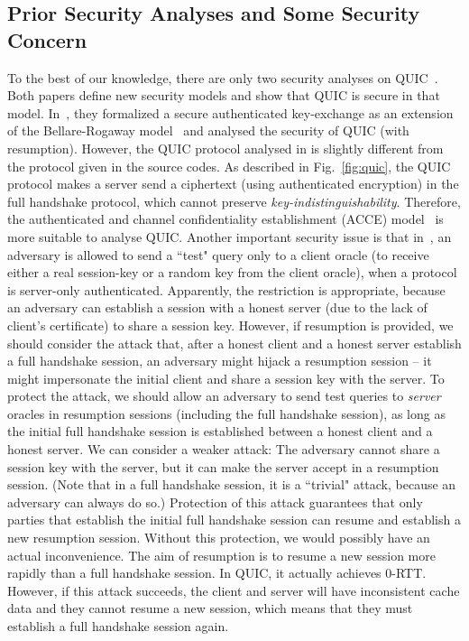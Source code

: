 \subsection{Prior Security Analyses and Some Security Concern} \label{sec:concern}
To the best of our knowledge, there are only two security analyses on QUIC~\cite{FG14:QUIC,LJBN15:QUIC}.
Both papers define new security models and show that QUIC is secure in that model.
In~\cite{FG14:QUIC}, they formalized a secure authenticated key-exchange
as an extension of the Bellare-Rogaway model~\cite{BR93:AKE} and analysed
the security of QUIC (with resumption).
However, the QUIC protocol analysed in \cite{FG14:QUIC} is slightly different from the protocol
given in the source codes.
As described in Fig.~\ref{fig:quic}, the QUIC protocol makes a server send a ciphertext (using authenticated encryption) in the full handshake protocol,
which cannot preserve \textit{key-indistinguishability}.
Therefore, the authenticated and channel confidentiality establishment (ACCE)
model~\cite{JKSS12:ACCE} is more suitable to analyse QUIC.
Another important security issue is that in~\cite{FG14:QUIC},
an adversary is allowed to send a ``test" query only to a client oracle (to receive either a real session-key
or  a random key from the client oracle),  when a protocol is server-only authenticated.
Apparently, the restriction is appropriate, because  an adversary can establish a session with
a honest server (due to the lack of client's certificate) to share a session key.
However, if resumption is provided, we should consider the attack that,
after a honest client and a honest server establish a full handshake session,
an adversary might hijack a resumption session -- it might impersonate the initial client and
share a session key with the server.
To protect the attack, we should allow an adversary to send test queries to \textit{server}  oracles
in resumption sessions (including the full handshake session),
as long as the initial full handshake session is established between a honest client and a honest server.
We can consider a weaker attack:
The adversary cannot share a session key with the server, but it can make the server accept in
a resumption session. (Note that in a full handshake session,
it is a ``trivial" attack, because an adversary can always do so.)
Protection of this attack guarantees that only parties that establish the initial full handshake session can
resume and establish a new resumption session.
Without this protection, we would possibly have an actual inconvenience.
The aim of resumption is to resume a new session more rapidly than a full handshake session.
In QUIC, it actually achieves $0$-RTT.
However, if this attack succeeds, the client and server will have inconsistent cache data
and they cannot resume a new session, which means that they must establish a full handshake session again.

